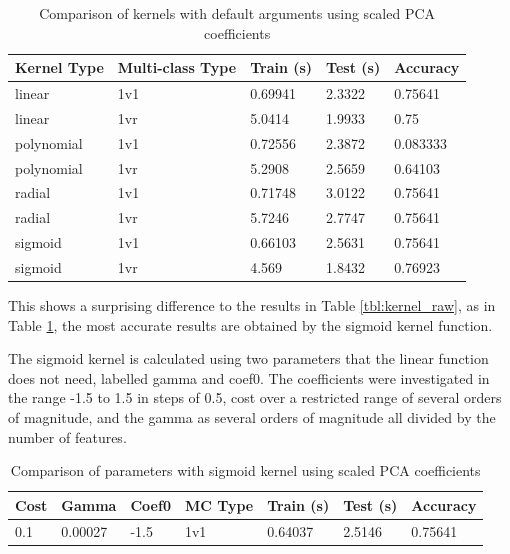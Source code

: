 \documentclass[a4paper, 10pt, conference]{ieeeconf}
\begin{document}
\begin{table}
\centering
\label{tbl:kernel_pca}
\caption{Comparison of kernels with default arguments using scaled PCA coefficients}
\begin{tabular}{lllll}
Kernel Type & Multi-class Type & Train (s) & Test (s) & Accuracy\\ \hline
linear & 1v1 & 0.69941 & 2.3322 & 0.75641\\ \hline
linear & 1vr & 5.0414 & 1.9933 & 0.75\\ \hline
polynomial & 1v1 & 0.72556 & 2.3872 & 0.083333\\ \hline
polynomial & 1vr & 5.2908 & 2.5659 & 0.64103\\ \hline
radial & 1v1 & 0.71748 & 3.0122 & 0.75641\\ \hline
radial & 1vr & 5.7246 & 2.7747 & 0.75641\\ \hline
sigmoid & 1v1 & 0.66103 & 2.5631 & 0.75641\\ \hline
sigmoid & 1vr & 4.569 & 1.8432 & 0.76923\\ \hline
\end{tabular}
\end{table}

This shows a surprising difference to the results in Table \ref{tbl:kernel_raw}, as in Table \ref{tbl:kernel_pca}, the most accurate results are obtained by the sigmoid kernel function.

The sigmoid kernel is calculated using two parameters that the linear function does not need, labelled gamma and coef0. The coefficients were investigated in the range -1.5 to 1.5 in steps of 0.5, cost over a restricted range of several orders of magnitude, and the gamma as several orders of magnitude all divided by the number of features.


\begin{table}
\centering
\label{tbl:sigmoid_params}
\caption{Comparison of parameters with sigmoid kernel using scaled PCA coefficients}
\begin{tabular}{lllllll}
Cost & Gamma & Coef0 & MC Type & Train (s) & Test (s) & Accuracy\\ \hline
0.1 & 0.00027 & -1.5 & 1v1 & 0.64037 & 2.5146 & 0.75641\\ \hline
\end{tabular}
\end{table}
\end{document}
